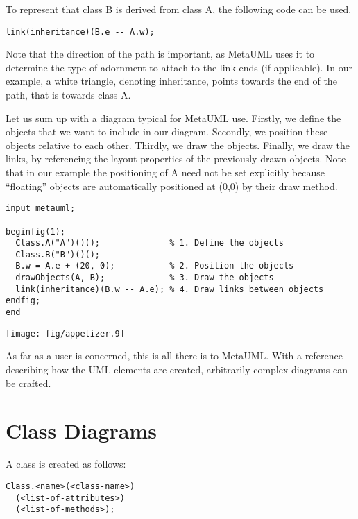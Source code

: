 \documentclass{article}
\newcommand{\code}{\ttfamily}
\begin{document}
To represent that class {\code B} is derived from class {\code A}, the following code can be used.

\begin{verbatim}
link(inheritance)(B.e -- A.w);
\end{verbatim}

Note that the direction of the path is important, as MetaUML uses it to determine the
type of adornment to attach to the link ends (if applicable). In our example, a white triangle,
denoting inheritance, points towards the end of the path, that is towards class {\code A}.

Let us sum up with a diagram typical for MetaUML use. Firstly, we define the objects that we want to include
in our diagram. Secondly, we position these objects relative to each other. Thirdly, we draw the objects. Finally, we
draw the links, by referencing the layout properties of the previously drawn objects. Note that in our example the
positioning of {\code A} need not be set explicitly because ``floating'' objects are automatically positioned at 
{\code (0,0)} by their draw method.

\begin{multicols}{2}

\begin{verbatim}
input metauml;

beginfig(1);
  Class.A("A")()();              % 1. Define the objects
  Class.B("B")()();
  B.w = A.e + (20, 0);           % 2. Position the objects
  drawObjects(A, B);             % 3. Draw the objects
  link(inheritance)(B.w -- A.e); % 4. Draw links between objects
endfig;
end
\end{verbatim}
\columnbreak
\texttt{[image: fig/appetizer.9]}
\end{multicols}

As far as a user is concerned, this is all there is to MetaUML. With a reference describing how the
UML elements are created, arbitrarily complex diagrams can be crafted.

\section{Class Diagrams}

A class is created as follows:

\begin{verbatim}
Class.<name>(<class-name>)
  (<list-of-attributes>)
  (<list-of-methods>);
\end{verbatim}
\end{document}

